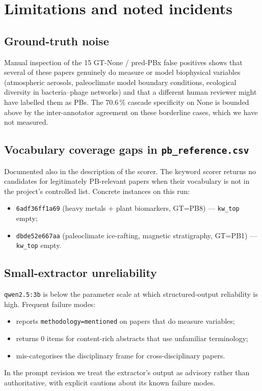 \documentclass[11pt,a4paper]{article}
\begin{document}
\section{Limitations and noted incidents}\label{sec:incidents}

\subsection{Ground-truth noise}
Manual inspection of the 15 GT-None / pred-PBx false positives shows that several of these papers genuinely do measure or model biophysical variables (atmospheric aerosols, paleoclimate model boundary conditions, ecological diversity in bacteria--phage networks) and that a different human reviewer might have labelled them as PBs. The $70.6\,\%$ cascade specificity on None is bounded above by the inter-annotator agreement on these borderline cases, which we have not measured.

\subsection{Vocabulary coverage gaps in \texttt{pb\_reference.csv}}
Documented also in the description of the scorer. The keyword scorer returns no candidates for legitimately PB-relevant papers when their vocabulary is not in the project's controlled list. Concrete instances on this run:
\begin{itemize}\itemsep0pt
\item \texttt{6adf36ff1a69} (heavy metals + plant biomarkers, GT=PB8) --- \texttt{kw\_top} empty;
\item \texttt{dbde52e667aa} (paleoclimate ice-rafting, magnetic stratigraphy, GT=PB1) --- \texttt{kw\_top} empty.
\end{itemize}

\subsection{Small-extractor unreliability}
\texttt{qwen2.5:3b} is below the parameter scale at which structured-output reliability is high. Frequent failure modes:
\begin{itemize}\itemsep0pt
\item reports \texttt{methodology=mentioned} on papers that do measure variables;
\item returns 0 items for content-rich abstracts that use unfamiliar terminology;
\item mis-categorises the disciplinary frame for cross-disciplinary papers.
\end{itemize}
In the prompt revision we treat the extractor's output as advisory rather than authoritative, with explicit cautions about its known failure modes.
\end{document}
